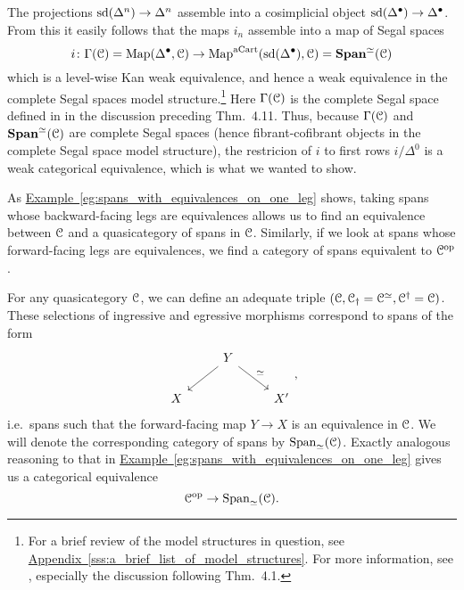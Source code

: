 \documentclass[main.tex]{subfiles}
\begin{document}
\begin{example}
  The projections $\mathrm{sd}(\Delta^{n}) \to \Delta^{n}$ assemble into a cosimplicial object $\mathrm{sd}(\Delta^{\bullet}) \to \Delta^{\bullet}$. From this it easily follows that the maps $i_{n}$ assemble into a map of Segal spaces
  \begin{equation*}
    i\colon \Gamma(\mathcal{C}) = \mathrm{Map}(\Delta^{\bullet}, \mathcal{C}) \to \mathrm{Map}^{\mathrm{aCart}}(\mathrm{sd}(\Delta^{\bullet}), \mathcal{C}) = \mathbf{Span}^{\simeq}(\mathcal{C})
  \end{equation*}
  which is a level-wise Kan weak equivalence, and hence a weak equivalence in the complete Segal spaces model structure.\footnote{For a brief review of the model structures in question, see \hyperref[sss:a_brief_list_of_model_structures]{Appendix~\ref*{sss:a_brief_list_of_model_structures}}. For more information, see \cite{qcats_vs_segal_spaces}, especially the discussion following Thm.\ 4.1.} Here $\Gamma(\mathcal{C})$ is the complete Segal space defined in \cite{qcats_vs_segal_spaces} in the discussion preceding Thm.\ 4.11. Thus, because $\Gamma(\mathcal{C})$ and $\mathbf{Span}^{\simeq}(\mathcal{C})$ are complete Segal spaces (hence fibrant-cofibrant objects in the complete Segal space model structure), the restricion of $i$ to first rows $i / \Delta^{0}$ is a weak categorical equivalence, which is what we wanted to show.
\end{example}

As \hyperref[eg:spans_with_equivalences_on_one_leg]{Example~\ref*{eg:spans_with_equivalences_on_one_leg}} shows, taking spans whose backward-facing legs are equivalences allows us to find an equivalence between $\mathcal{C}$ and a quasicategory of spans in $\mathcal{C}$. Similarly, if we look at spans whose forward-facing legs are equivalences, we find a category of spans equivalent to $\mathcal{C}^{\mathrm{op}}$.

\begin{example}
  \label{eg:spans_with_equivalences_on_forwards_leg}
  For any quasicategory $\mathcal{C}$, we can define an adequate triple $(\mathcal{C}, \mathcal{C}_{\dagger} = \mathcal{C}^{\simeq}, \mathcal{C}^{\dagger} = \mathcal{C})$. These selections of ingressive and egressive morphisms correspond to spans of the form
  \begin{equation*}
    \begin{tikzcd}
      & Y
      \arrow[dl]
      \arrow[dr, "\simeq"]
      \\
      X
      && X'
    \end{tikzcd},
  \end{equation*}
  i.e.\ spans such that the forward-facing map $Y \to X$ is an equivalence in $\mathcal{C}$. We will denote the corresponding category of spans by $\mathrm{Span}_{\simeq}(\mathcal{C})$. Exactly analogous reasoning to that in \hyperref[eg:spans_with_equivalences_on_one_leg]{Example~\ref*{eg:spans_with_equivalences_on_one_leg}} gives us a categorical equivalence
  \begin{equation*}
    \mathcal{C}^{\mathrm{op}} \to \mathrm{Span}_{\simeq}(\mathcal{C}).
  \end{equation*}
\end{example}
\end{document}
